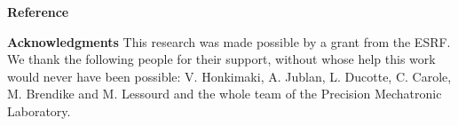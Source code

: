 \textbf{Reference}
\printbibliography[heading=none]

\textbf{Acknowledgments}
This research was made possible by a grant from the ESRF.
We thank the following people for their support, without whose help this work would never have been possible: V. Honkimaki, A. Jublan, L. Ducotte, C. Carole, M. Brendike and M. Lessourd and the whole team of the Precision Mechatronic Laboratory.

